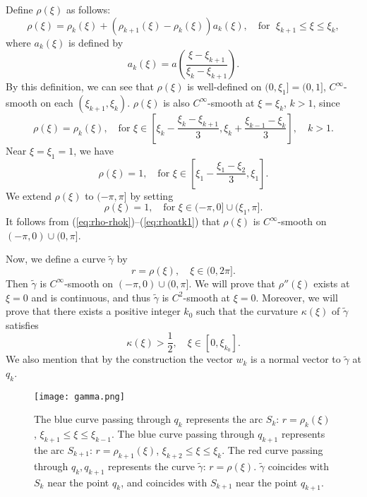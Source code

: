 \documentclass[12pt]{article}
\begin{document}
Define $\rho(\xi)$ as follows:
\begin{equation}\label{eq:rho-rhok}
\rho(\xi) = \rho_k(\xi) + \left( \rho_{k+1}(\xi) - \rho_k(\xi) \right) a_k(\xi), 
\quad \text{for }\; \xi_{k+1} \leq \xi \leq \xi_k,
\end{equation}
where $a_k(\xi)$ is defined by
$$
a_k(\xi) = a\left( \frac{\xi - \xi_{k+1}}{\xi_k - \xi_{k+1}} \right).
$$
By this definition, we can see that $\rho(\xi)$ is well-defined on $(0,\xi_1]=(0,1]$, 
$C^{\infty}$-smooth on each $(\xi_{k+1},\xi_k)$.
$\rho(\xi)$ is also $C^{\infty}$-smooth at $\xi=\xi_k$, $k>1$, since 
\begin{equation}\label{eq:rhoatkp1}
\rho(\xi) = \rho_{k}(\xi), \quad \text{for } 
\xi \in 
\left[ \xi_{k}- \frac{\xi_k - \xi_{k+1}}{3}, \xi_{k} + \frac{\xi_{k-1} - \xi_{k}}{3} \right], 
\quad k > 1.
\end{equation}
Near $\xi=\xi_1=1$, we have
\begin{equation}
\label{eq:rhoatkp}
\rho(\xi) = 1, \quad \text{for } \xi \in 
\left[ \xi_1 - \frac{\xi_1 - \xi_2}{3}, \xi_1 \right].
\end{equation}
We extend $\rho(\xi)$ to $(-\pi, \pi]$ by setting 
\begin{equation}\label{eq:rhoatk1}
\rho(\xi) = 1, 
\quad
\text{for } \xi \in (-\pi, 0]\cup(\xi_1, \pi]. 
\end{equation}
It follows from (\ref{eq:rho-rhok})--(\ref{eq:rhoatk1})
that $\rho(\xi)$ is $C^{\infty}$-smooth on $(-\pi, 0)\cup(0,\pi]$.


Now, we define a curve $\tilde{\gamma}$ by
$$
r = \rho(\xi), \quad \xi \in (0, 2\pi].
$$
Then $\tilde{\gamma}$ is $C^{\infty}$-smooth on $(-\pi, 0)\cup(0,\pi]$.
We will prove that $\rho''(\xi)$ exists at $\xi = 0$ and is continuous, 
and thus $\tilde{\gamma}$ is $C^2$-smooth at $\xi = 0$.  
Moreover, we will prove that there exists a positive integer $k_0$ such that the 
curvature $\kappa(\xi) $ of  $\tilde{\gamma}$  satisfies
$$
\kappa(\xi) > \frac{1}{2},
\quad  \xi \in [0, \xi_{k_0}].
$$
We also mention that by the construction the vector $w_k$ is a 
normal vector to $\tilde{\gamma}$ at $q_k$.


\begin{figure}[htbp]
  \begin{center}
  \texttt{[image: gamma.png]}
  \end{center}
  \captionsetup{width=0.75\textwidth} 
  \caption{The blue curve passing through $q_k$ represents
   the arc $S_k$: $r = \rho_k(\xi)$, 
   $\xi_{k+1} \leq \xi \leq \xi_{k-1}$. 
  The blue curve passing through $q_{k+1}$ represents 
  the arc $S_{k+1}$: $r = \rho_{k+1}(\xi)$,  
  $\xi_{k+2} \leq \xi \leq \xi_k$. 
  The red curve passing through $q_k, q_{k+1}$ represents the curve $\tilde{\gamma}$: $r = \rho(\xi)$.
  $\tilde{\gamma}$
 coincides with $S_k$ near the point $q_k$, and coincides with $S_{k+1}$ near the point $q_{k+1}$.}
  \label{gamma}
\end{figure}
\end{document}
